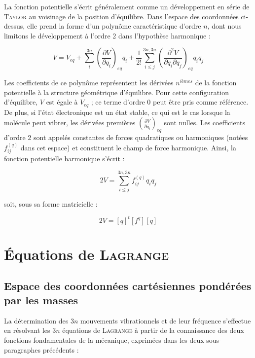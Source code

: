 \documentclass[12pt,a4paper]{book}
\begin{document}
La fonction potentielle s'écrit généralement comme un développement en série de \textsc{Taylor} au voisinage de la position d'équilibre. Dans l'espace des coordonnées ci-dessus, elle prend la forme d'un polynôme caractéristique d'ordre $n$, dont nous limitons le développement à l'ordre 2 dans l'hypothèse harmonique :

\begin{equation}
V = V_{eq} + \sum^{3n}_i\left(\frac{\partial V}{\partial q_i}\right)_{eq} q_i + \frac{1}{2!} \sum^{3n,3n}_{i\leq j}\left(\frac {\partial^2 V}{\partial q_i \partial q_j}\right)_{eq} q_iq_j
\end{equation}

Les coefficients de ce polynôme représentent les dérivées $n^{ièmes}$ de la fonction potentielle à la structure géométrique d'équilibre. Pour cette configuration d'équilibre, $V$ est égale à $V_{eq}$ ; ce terme d'ordre 0 peut être pris comme référence. De plus, si l'état électronique est un état stable, ce qui est le cas lorsque la molécule peut vibrer, les dérivées premières $\left(\frac{\partial V}{\partial q_i}\right)_{eq}$ sont nulles. Les coefficients d'ordre 2 sont appelés constantes de forces quadratiques ou harmoniques (notées $f^{(q)}_{ij}$ dans cet espace) et constituent le champ de force harmonique.
Ainsi, la fonction potentielle harmonique s'écrit :

\begin{equation}
2V = \sum^{3n,3n}_{i\leq j} f^{(q)}_{ij} q_iq_j
\end{equation}

\noindent soit, sous sa forme matricielle :

\begin{equation}
2V = \left[q\right]^t\left[ f^q\right]\left[q\right]
\end{equation}


\section{Équations de \textsc{Lagrange}}

\subsection{Espace des coordonnées cartésiennes pondérées par les masses}\label{esp_pond_masse}
La détermination des $3n$ mouvements vibrationnels et de leur fréquence s'effectue en résolvant les $3n$ équations de \textsc{Lagrange} à partir de la connaissance des deux fonctions fondamentales de la mécanique, exprimées dans les deux sous-paragraphes précédents :
\end{document}
